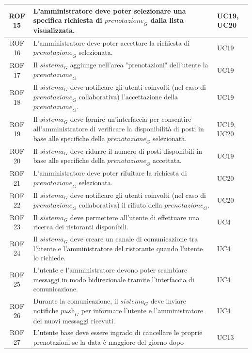 \documentclass[12pt, oneside]{article}
\begin{document}
\begin{longtable}{|c|p{14cm}|p{2cm}|}
    \hline
    ROF 15 & L'amministratore deve poter selezionare una specifica richiesta di $\textit{prenotazione}_G$ dalla lista visualizzata. & UC19, UC20 \\
    \hline
    ROF 16 & L'amministratore deve poter accettare la richiesta di $\textit{prenotazione}_G$ selezionata. & UC19 \\
    \hline
    ROF 17 & Il $\textit{sistema}_G$ aggiunge nell'area "prenotazioni" dell'utente la $\textit{prenotazione}_G$ & UC19 \\
    \hline
    ROF 18 & Il $\textit{sistema}_G$ deve notificare gli utenti coinvolti (nel caso di $\textit{prenotazione}_G$ collaborativa) l'accettazione della $\textit{prenotazione}_G$. & UC19 \\
    \hline
    ROF 19 & Il $\textit{sistema}_G$ deve fornire un'interfaccia per consentire all'amministratore di verificare la disponibilità di posti in base alle specifiche della $\textit{prenotazione}_G$ selezionata. & UC19, UC20 \\
    \hline
    ROF 20 & Il $\textit{sistema}_G$ deve ridurre il numero di posti disponibili in base alle specifiche della $\textit{prenotazione}_G$ accettata. & UC19 \\
    \hline
    ROF 21 & L'amministratore deve poter rifuitare la richiesta di $\textit{prenotazione}_G$ selezionata. & UC20 \\
    \hline
    ROF 22 & Il $\textit{sistema}_G$ deve notificare gli utenti coinvolti (nel caso di $\textit{prenotazione}_G$ collaborativa) il rifiuto della $\textit{prenotazione}_G$. & UC20 \\
    \hline
    ROF 23 & Il $\textit{sistema}_G$ deve permettere all'utente di effettuare una ricerca dei ristoranti disponibili. & UC4 \\
    \hline
    ROF 24 & Il $\textit{sistema}_G$ deve creare un canale di comunicazione tra l'utente e l'amministratore del ristorante quando l'utente lo richiede. & UC4 \\
    \hline
    ROF 25 & L'utente e l'amministratore devono poter scambiare messaggi in modo bidirezionale tramite l'interfaccia di comunicazione. & UC4 \\
    \hline
    ROF 26 & Durante la comunicazione, il $\textit{sistema}_G$ deve inviare notifiche $\textit{push}_G$ per informare l'utente e l'amministratore dei nuovi messaggi ricevuti. & UC4 \\
    \hline
    ROF 27 & L'utente base deve essere ingrado di cancellare le proprie prenotazioni se la data è maggiore del giorno dopo & UC13 \\ 

\end{longtable}
\end{document}
